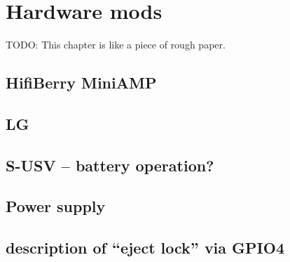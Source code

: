 \chapter{Hardware mods}

TODO: 
This chapter is like a piece of rough paper.

\section{}
\section{\raspidisplay}
\section{HifiBerry MiniAMP}
\section{LG \LGdrive}
\section{S-USV -- battery operation?}
\section{Power supply}
\section{description of ``eject lock'' via GPIO4}

